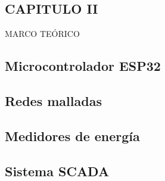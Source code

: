 \documentclass[12pt,letterpaper]{article}
\begin{document}
\newpage

\begin{center}
	\section*{CAPITULO II} 	
\end{center}

\vspace{0.5cm}

\begin{center}
	{\large MARCO TEÓRICO}
\end{center}

\vspace{0.5cm}


\subsection*{Microcontrolador ESP32}

\subsection*{Redes malladas}

\subsection*{Medidores de energía}

\subsection{Sistema SCADA}

	
\newpage



\end{document}
